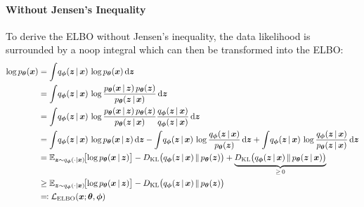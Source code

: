 				\paragraph{Without Jensen's Inequality}
					To derive the ELBO without Jensen's inequality, the data likelihood is surrounded by a noop integral which can then be transformed into the ELBO:
					\begin{align}
						\log p_{\vec{\theta}}(\vec{x})
						 & = \int\! q_{\vec{\phi}}(\vec{z} \given \vec{x}) \, \log p_{\vec{\theta}}(\vec{x}) \dd{\vec{z}}                                                                                                                                                                                                                                                                                                                           \\
						 & = \int\! q_{\vec{\phi}}(\vec{z} \given \vec{x}) \, \log \frac{p_{\vec{\theta}}(\vec{x} \given \vec{z}) \, p_{\vec{\theta}}(\vec{z})}{p_{\vec{\theta}}(\vec{z} \given \vec{x})} \dd{\vec{z}}                                                                                                                                                                                                                              \\
						 & = \int\! q_{\vec{\phi}}(\vec{z} \given \vec{x}) \, \log \frac{p_{\vec{\theta}}(\vec{x} \given \vec{z}) \, p_{\vec{\theta}}(\vec{z})}{p_{\vec{\theta}}(\vec{z} \given \vec{x})} \frac{q_{\vec{\phi}}(\vec{z} \given \vec{x})}{q_{\vec{\phi}}(\vec{z} \given \vec{x})} \dd{\vec{z}}                                                                                                                                        \\
						 & = \int\! q_{\vec{\phi}}(\vec{z} \given \vec{x}) \, \log p_{\vec{\theta}}(\vec{x} \given \vec{z}) \dd{\vec{z}} - \int\! q_{\vec{\phi}}(\vec{z} \given \vec{x}) \, \log \frac{q_{\vec{\phi}}(\vec{z} \given \vec{x})}{p_{\vec{\theta}}(\vec{z})} \dd{\vec{z}} + \int\! q_{\vec{\phi}}(\vec{z} \given \vec{x}) \, \log \frac{q_{\vec{\phi}}(\vec{z} \given \vec{x})}{p_{\vec{\theta}}(\vec{z} \given \vec{x})} \dd{\vec{z}} \\
						 & = \E_{\vec{z} \sim q_{\vec{\phi}}(\cdot \subgiven \vec{x})}\!\big[\! \log p_{\vec{\theta}}(\vec{x} \given \vec{z}) \big] - D_\mathrm{KL}\big( q_{\vec{\phi}}(\vec{z} \given \vec{x}) \,\Vert\, p_{\vec{\theta}}(\vec{z}) \big) + \underbrace{D_\mathrm{KL}\big( q_{\vec{\phi}}(\vec{z} \given \vec{x}) \,\Vert\, p_{\vec{\theta}}(\vec{z} \given \vec{x}) \big)}_{\geq\, 0}                                              \\
						 & \geq \E_{\vec{z} \sim q_{\vec{\phi}}(\cdot \subgiven \vec{x})}\!\big[\! \log p_{\vec{\theta}}(\vec{x} \given \vec{z}) \big] - D_\mathrm{KL}\big( q_{\vec{\phi}}(\vec{z} \given \vec{x}) \,\Vert\, p_{\vec{\theta}}(\vec{z}) \big)                                                                                                                                                                                        \\
						 & \eqqcolon \mathcal{L}_\mathrm{ELBO}(\vec{x}; \vec{\theta}, \vec{\phi})
					\end{align}
